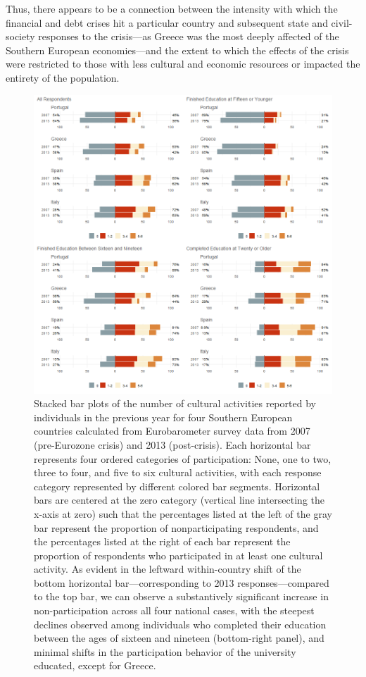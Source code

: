 \documentclass{article}
\begin{document}
Thus, there appears to be a connection between the intensity with which the financial and debt crises hit a particular country and subsequent state and civil-society responses to the crisis---as Greece was the most deeply affected of the Southern European economies---and the extent to which the effects of the crisis were restricted to those with less cultural and economic resources or impacted the entirety of the population. 

\begin{figure}
    \centering
    \includegraphics[width=1.0\textwidth]{Plots/cult-cat-by-year-by-country-combo.png}
    \caption{Stacked bar plots of the number of cultural activities reported by individuals in the previous year for four Southern European countries calculated from Eurobarometer survey data from 2007 (pre-Eurozone crisis) and 2013 (post-crisis). Each horizontal bar represents four ordered categories of participation: None, one to two, three to four, and five to six cultural activities, with each response category represented by different colored bar segments. Horizontal bars are centered at the zero category (vertical line intersecting the x-axis at zero) such that the percentages listed at the left of the gray bar represent the proportion of nonparticipating respondents, and the percentages listed at the right of each bar represent the proportion of respondents who participated in at least one cultural activity. As evident in the leftward within-country shift of the bottom horizontal bar---corresponding to 2013 responses---compared to the top bar, we can observe a substantively significant increase in non-participation across all four national cases, with the steepest declines observed among individuals who completed their education between the ages of sixteen and nineteen (bottom-right panel), and minimal shifts in the participation behavior of the university educated, except for Greece.}
    \label{fig: main}
\end{figure}
\end{document}
